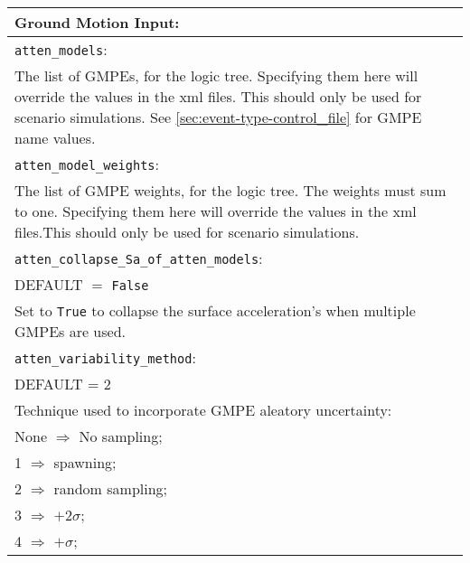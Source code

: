 \vspace{2em}
\begin{tabular}{|p{\textwidth}|}
\hline
\vspace{0.3em} \noindent \Large \textbf{Ground Motion Input:} \normalsize \\
\hline \vspace{0.1em} \texttt{atten\_models}: \\ The list of GMPEs,
for the logic tree.  Specifying them here will override the values in
the xml files. This should only be used for scenario simulations. 
See  \cref{sec:event-type-control_file} for GMPE name values.\\
\hline \vspace{0.1em} \texttt{atten\_model\_weights}: \\ The list of
GMPE weights, for the logic tree.  The weights must sum to
one. Specifying them here will override the values in the xml
files.This should only be used for scenario simulations. \\
\hline \vspace{0.1em}
\texttt{atten\_collapse\_Sa\_of\_atten\_models}: \\
DEFAULT $=$ \texttt{False} \\
Set to \texttt{True} to collapse the surface acceleration's when
multiple GMPEs are used.\\
\hline \vspace{0.1em} \texttt{atten\_variability\_method}: \\
DEFAULT  = 2 \\
 Technique used to
incorporate GMPE aleatory uncertainty: \\
 \hspace{0.5em} None $\Rightarrow$ No sampling; \\
 \hspace{0.5em} 1 $\Rightarrow$ spawning; \\
 \hspace{0.5em} 2 $\Rightarrow$ random sampling; \\
 \hspace{0.5em} 3 $\Rightarrow$ $+2\sigma$; \\
 \hspace{0.5em} 4 $\Rightarrow$ $+\sigma$; \\

\end{tabular}
